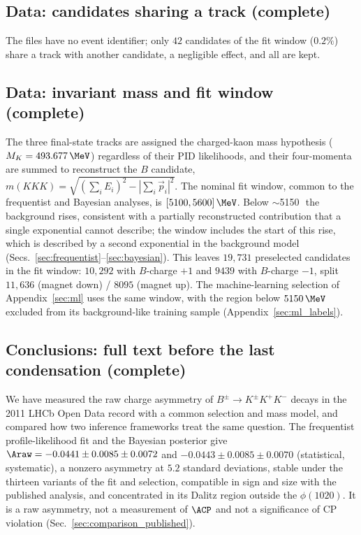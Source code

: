\subsection{Data: candidates sharing a track (complete)}
The files have no event identifier; only $42$ candidates of the fit window ($0.2\%$) share a track with another candidate, a negligible effect, and all are kept.

\subsection{Data: invariant mass and fit window (complete)}
The three final-state tracks are assigned the charged-kaon mass hypothesis ($M_K=493.677\,\MeV$) regardless of their PID likelihoods, and their four-momenta are summed to reconstruct the $B$ candidate, $m(KKK)=\sqrt{(\sum_i E_i)^2-|\sum_i \vec{p}_i|^2}$. The nominal fit window, common to the frequentist and Bayesian analyses, is $[5100,5600]\,\MeV$. Below $\sim$5150\,\MeV\ the background rises, consistent with a partially reconstructed contribution that a single exponential cannot describe; the window includes the start of this rise, which is described by a second exponential in the background model (Secs.~\ref{sec:frequentist}--\ref{sec:bayesian}). This leaves $19{,}731$ preselected candidates in the fit window: $10{,}292$ with $B$-charge $+1$ and $9439$ with $B$-charge $-1$, split $11{,}636$ (magnet down) / $8095$ (magnet up). The machine-learning selection of Appendix~\ref{sec:ml} uses the same window, with the region below $5150\,\MeV$ excluded from its background-like training sample (Appendix~\ref{sec:ml_labels}).

\subsection{Conclusions: full text before the last condensation (complete)}
We have measured the raw charge asymmetry of $B^\pm\to K^\pm K^+K^-$ decays in the 2011 LHCb Open Data record with a common selection and mass model, and compared how two inference frameworks treat the same question. The frequentist profile-likelihood fit and the Bayesian posterior give $\Araw=-0.0441\pm0.0085\pm0.0072$ and $-0.0443\pm0.0085\pm0.0070$ (statistical, systematic), a nonzero asymmetry at $5.2$ standard deviations, stable under the thirteen variants of the fit and selection, compatible in sign and size with the published analysis, and concentrated in its Dalitz region outside the $\phi(1020)$. It is a raw asymmetry, not a measurement of $\ACP$ and not a significance of CP violation (Sec.~\ref{sec:comparison_published}).

